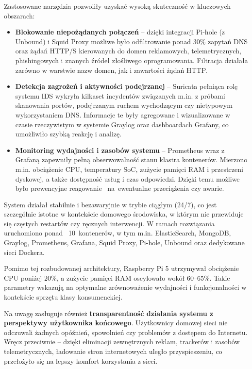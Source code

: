 \documentclass[
    left=2.5cm,         %
    right=2.5cm,        %
    top=2.5cm,          %
    bottom=3cm,         %
    bindingoffset=6mm,  %
    nohyphenation=true %
]{eiti/eiti-thesis} %
\begin{document}
Zastosowane narzędzia pozwoliły uzyskać wysoką skuteczność w kluczowych obszarach:
\begin{itemize}
    \item \textbf{Blokowanie niepożądanych połączeń} – dzięki integracji Pi-hole (z Unbound) i Squid Proxy możliwe było odfiltrowanie ponad 30\% zapytań DNS oraz żądań HTTP/S kierowanych do domen reklamowych, telemetrycznych, phishingowych i znanych źródeł złośliwego oprogramowania. Filtracja działała zarówno w warstwie nazw domen, jak i zawartości żądań HTTP.
    
    \item \textbf{Detekcja zagrożeń i aktywności podejrzanej} – Suricata pełniąca rolę systemu IDS wykryła kilkaset incydentów związanych m.in. z próbami skanowania portów, podejrzanym ruchem wychodzącym czy nietypowym wykorzystaniem DNS. Informacje te były agregowane i wizualizowane w czasie rzeczywistym w systemie Graylog oraz dashboardach Grafany, co umożliwiło szybką reakcję i analizę.

    \item \textbf{Monitoring wydajności i zasobów systemu} – Prometheus wraz z Grafaną zapewniły pełną obserwowalność stanu klastra kontenerów. Mierzono m.in. obciążenie CPU, temperatury SoC, zużycie pamięci RAM i przestrzeni dyskowej, a także dostępność usług i czas odpowiedzi. Dzięki temu możliwe było prewencyjne reagowanie ~na~ewentualne przeciążenia czy awarie.
\end{itemize}

System działał stabilnie i bezawaryjnie w trybie ciągłym (24/7), co jest szczególnie istotne w kontekście domowego środowiska, w którym nie przewiduje się częstych restartów czy ręcznych interwencji. W ramach rozwiązania uruchomiono ponad ~10~kontenerów, w tym m.in. ElasticSearch, MongoDB, Graylog, Prometheus, Grafana, Squid Proxy, Pi-hole, Unbound oraz dedykowane sieci Dockera. 

Pomimo tej rozbudowanej architektury, Raspberry Pi 5 utrzymywał obciążenie CPU poniżej 20\%, a zużycie pamięci RAM oscylowało wokół 60--65\%. Takie parametry wskazują na optymalne zrównoważenie wydajności i funkcjonalności w kontekście sprzętu klasy konsumenckiej.

Na uwagę zasługuje również \textbf{transparentność działania systemu z perspektywy użytkownika końcowego}. Użytkownicy domowej sieci nie odczuwali żadnych opóźnień, spowolnień czy problemów z dostępem do Internetu. Wręcz przeciwnie – dzięki eliminacji zewnętrznych reklam, trackerów i zasobów telemetrycznych, ładowanie stron internetowych uległo przyspieszeniu, co przełożyło się na lepszy komfort korzystania z sieci.
\end{document}
